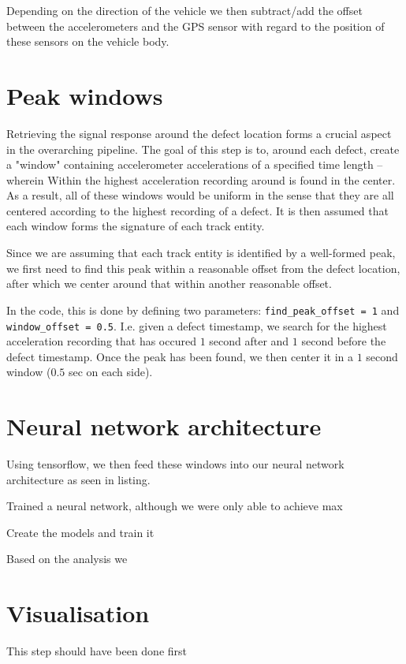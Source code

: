 Depending on the direction of the vehicle we then subtract/add the offset between the accelerometers and the GPS sensor with regard to the position of these sensors on the vehicle body.


\section{Peak windows}
Retrieving the signal response around the defect location forms a crucial aspect in the overarching pipeline. The goal of this step is to, around each defect, create a "window" containing accelerometer accelerations of a specified time length -- wherein Within the highest acceleration recording around is found in the center. As a result, all of these windows would be uniform in the sense that they are all centered according to the highest recording of a defect. It is then assumed that each window forms the signature of each track entity. 

Since we are assuming that each track entity is identified by a well-formed peak, we first need to find this peak within a reasonable offset from the defect location, after which we center around that within another reasonable offset. 

In the code, this is done by defining two parameters: \verb|find_peak_offset = 1| and \verb|window_offset = 0.5|. I.e. given a defect timestamp, we search for the highest acceleration recording that has occured $1$ second after and $1$ second before the defect timestamp. Once the peak has been found, we then center it in a $1$ second window ($0.5$ sec on each side).



\section{Neural network architecture}
Using tensorflow, we then feed these windows into our neural network architecture as seen in listing. 

Trained a neural network, although we were only able to achieve max

Create the models and train it 

Based on the analysis we

\section{Visualisation}
This step should have been done first

